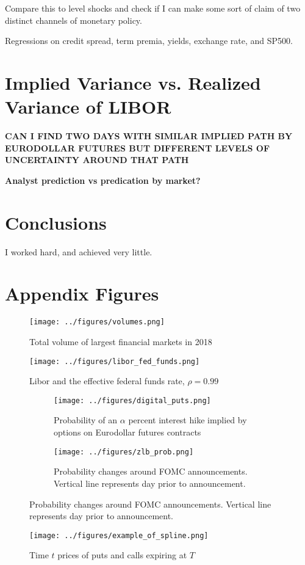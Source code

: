 \documentclass[11pt]{article}
\begin{document}
Compare this to level shocks and check if I can make some sort of claim of two distinct channels of monetary policy.

Regressions on credit spread, term premia, yields, exchange rate, and SP500.  

\section{Implied Variance vs. Realized Variance of LIBOR}


\textbf{CAN I FIND TWO DAYS WITH SIMILAR IMPLIED PATH BY EURODOLLAR FUTURES BUT DIFFERENT LEVELS OF UNCERTAINTY AROUND THAT PATH}

\textbf{Analyst prediction vs predication by market?}
\section{Conclusions}\label{conclusions}
I worked hard, and achieved very little.

\section{Appendix Figures }
\begin{figure}[!htb]
	\centering
	\texttt{[image: ../figures/volumes.png]}
	\caption{Total volume of largest financial markets in 2018}
	\label{fig:liquidity}
\end{figure}
\begin{figure}
	\centering
	\texttt{[image: ../figures/libor\_fed\_funds.png]}
	\caption{Libor and the effective federal funds rate, $\rho = 0.99$}
	\label{fig:libor_fed_funds_rate}
\end{figure}
\begin{figure}
	\centering
	\begin{subfigure}{.5\textwidth}
		\texttt{[image: ../figures/digital\_puts.png]}
		\caption{Probability of an $\alpha$ percent interest hike implied by options on Eurodollar futures contracts}
		\label{fig:hike_probs}
	\end{subfigure}%
	\begin{subfigure}{.5\textwidth}
		\texttt{[image: ../figures/zlb\_prob.png]}
		\caption{Probability changes around FOMC announcements. Vertical line represents day prior to announcement. }
		\label{fig:hike_probs_fomc}
	\end{subfigure}
\end{figure}
\begin{figure}
	\centering
	\texttt{[image: ../figures/example\_of\_spline.png]}
	\caption{Time $t$ prices of puts and calls expiring at $T$}
	\label{fig:spline}
\end{figure}
\end{document}
